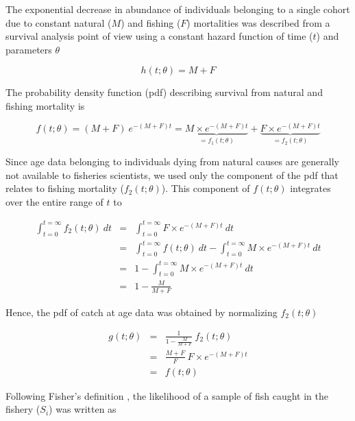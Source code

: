 The exponential decrease in abundance of individuals belonging to a single cohort due to constant natural ($M$) and fishing ($F$) mortalities was described from a survival analysis point of view \citep{cox84b} using a constant hazard function of time ($t$) and parameters $\theta$

\begin{equation}
h(t; \theta) = M + F
\end{equation}

The probability density function (pdf) describing survival from natural and fishing mortality is

\begin{equation}
f(t; \theta) = (M + F) \ e^{-(M+F)t} = \underbrace{M \times e^{-(M+F)t}}_{=f_{1}(t; \theta)} + \underbrace{F \times e^{-(M+F)t}}_{=f_{2}(t; \theta)}
\end{equation}

Since age data belonging to individuals dying from natural causes are generally not available to fisheries scientists, we used only the component of the pdf that relates to fishing mortality ($f_{2}(t; \theta)$). This component of $f(t; \theta)$ integrates over the entire range of $t$ to 

\begin{eqnarray}
\int_{t=0}^{t=\infty} f_{2}(t; \theta) \ dt &=& \int_{t=0}^{t=\infty} F \times e^{-(M+F)t} \ dt\\
                                        &=& \int_{t=0}^{t=\infty} f(t; \theta) \ dt - \int_{t=0}^{t=\infty} M \times e^{-(M+F)t} \ dt\\
                                        &=& 1 - \int_{t=0}^{t=\infty} M \times e^{-(M+F)t} \ dt \\
                                        &=& 1 - \frac{M}{M+F}
\end{eqnarray}

Hence, the pdf of catch at age data was obtained by normalizing $f_{2}(t; \theta)$

\begin{eqnarray}
g(t; \theta) &=& \frac{1}{1 - \frac{M}{M+F}} \ f_{2}(t; \theta) \\
             &=& \frac{M+F}{F} \ F \times e^{-(M+F)t} \\
             &=& f(t; \theta)
\end{eqnarray} 

Following Fisher's definition \citep{edwards1992likelihood}, the likelihood of a sample of fish caught in the fishery ($S_{i}$) was written as 

